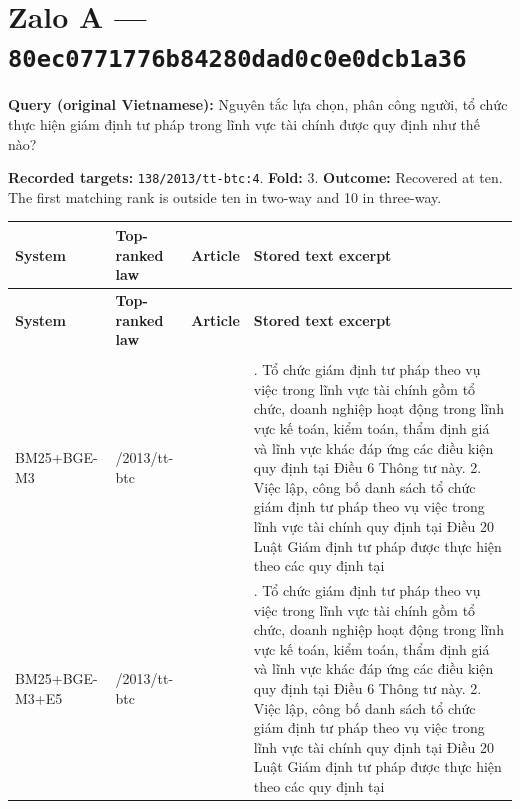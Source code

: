 \section{Zalo A — \texttt{80ec0771\allowbreak{}776b8428\allowbreak{}0dad0c0e\allowbreak{}0dcb1a36}}

\textbf{Query (original Vietnamese):} Nguyên tắc lựa chọn, phân công người, tổ chức thực hiện giám định tư pháp trong lĩnh vực tài chính được quy định như thế nào?

\textbf{Recorded targets:} \texttt{138/2013\allowbreak{}/tt-btc:\allowbreak{}4}. \textbf{Fold:} 3. \textbf{Outcome:} Recovered at ten. The first matching rank is outside ten in two-way and 10 in three-way.

\begingroup
\scriptsize
\setlength{\tabcolsep}{2pt}
\renewcommand{\arraystretch}{1.0}
\begin{longtable}{>{\raggedright\arraybackslash}p{2.012cm}>{\raggedright\arraybackslash}p{2.083cm}>{\raggedright\arraybackslash}p{1.882cm}>{\raggedright\arraybackslash}p{9.143cm}}
\toprule
\textbf{System} & \textbf{Top-ranked law} & \textbf{Article} & \textbf{Stored text excerpt} \\
\midrule
\endfirsthead
\toprule
\textbf{System} & \textbf{Top-ranked law} & \textbf{Article} & \textbf{Stored text excerpt} \\
\midrule
\endhead
\midrule
\multicolumn{4}{r}{\footnotesize Continued on next page}\\
\endfoot
\bottomrule
\endlastfoot
BM25+\allowbreak{}BGE-M3 & 138/\allowbreak{}2013/\allowbreak{}tt-btc & 7 & 1. Tổ chức giám định tư pháp theo vụ việc trong lĩnh vực tài chính gồm tổ chức, doanh nghiệp hoạt động trong lĩnh vực kế toán, kiểm toán, thẩm định giá và lĩnh vực khác đáp ứng các điều kiện quy định tại Điều 6 Thông tư này. 2. Việc lập, công bố danh sách tổ chức giám định tư pháp theo vụ việc trong lĩnh vực tài chính quy định tại Điều 20 Luật Giám định tư pháp được thực hiện theo các quy định tại \\
BM25+\allowbreak{}BGE-M3+\allowbreak{}E5 & 138/\allowbreak{}2013/\allowbreak{}tt-btc & 7 & 1. Tổ chức giám định tư pháp theo vụ việc trong lĩnh vực tài chính gồm tổ chức, doanh nghiệp hoạt động trong lĩnh vực kế toán, kiểm toán, thẩm định giá và lĩnh vực khác đáp ứng các điều kiện quy định tại Điều 6 Thông tư này. 2. Việc lập, công bố danh sách tổ chức giám định tư pháp theo vụ việc trong lĩnh vực tài chính quy định tại Điều 20 Luật Giám định tư pháp được thực hiện theo các quy định tại \\
\end{longtable}
\endgroup

